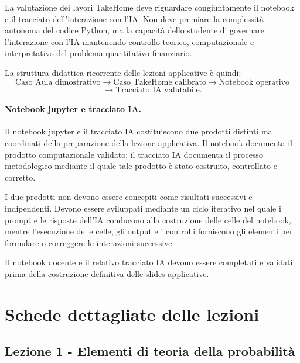 \documentclass[12pt,a4paper]{article}%
\newcommand{\1}{\mathbf{1}}
\begin{document}
La valutazione dei lavori TakeHome deve riguardare congiuntamente il notebook
e il tracciato dell'interazione con l'IA. Non deve premiare la complessit\`{a}
autonoma del codice Python, ma la capacit\`{a} dello studente di governare
l'interazione con l'IA mantenendo controllo teorico, computazionale e
interpretativo del problema quantitativo-finanziario.

La struttura didattica ricorrente delle lezioni applicative \`{e} quindi:
$$
\text{Caso Aula dimostrativo}
\longrightarrow
\text{Caso TakeHome calibrato}
\longrightarrow
\text{Notebook operativo} 
$$ 
$$
\longrightarrow
\text{Tracciato IA valutabile}.
$$

\paragraph{Notebook jupyter e tracciato IA.}

Il notebook jupyter e il tracciato IA costituiscono
due prodotti distinti ma coordinati della preparazione della lezione
applicativa. Il notebook documenta il prodotto computazionale validato; il
tracciato IA documenta il processo metodologico mediante il quale tale
prodotto \`{e} stato costruito, controllato e corretto.

I due prodotti non devono essere concepiti come risultati successivi e
indipendenti. Devono essere sviluppati mediante un ciclo iterativo nel quale
i prompt e le risposte dell'IA conducono alla costruzione delle celle del
notebook, mentre l'esecuzione delle celle, gli output e i controlli forniscono
gli elementi per formulare o correggere le interazioni successive.

Il notebook docente e il relativo tracciato IA devono essere completati e
validati prima della costruzione definitiva delle slides applicative.

\section{Schede dettagliate delle lezioni}

\subsection{Lezione 1 - Elementi di teoria della probabilit\`{a}}
\end{document}
